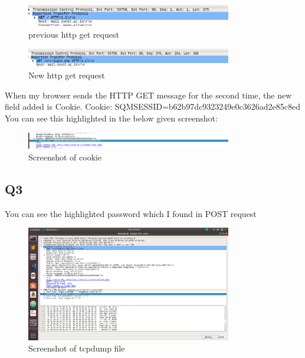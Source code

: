 \documentclass{article}
\begin{document}
 \begin{figure}[H]
 \centering
 \includegraphics[width=0.8\textwidth]{../Set5/q2/a.png}
 \caption{\label{fig:PING}previous http get request}
 \end{figure}
 
  \begin{figure}[H]
 \centering
 \includegraphics[width=0.8\textwidth]{../Set5/q2/b.png}
 \caption{\label{fig:PING}New http get request}
 \end{figure}

When my browser sends the HTTP GET message for the second time, the new
field added is Cookie. Cookie: SQMSESSID=b62b97dc9323249e0c3626ad2e85c8ed
You can see this highlighted in the below given screenshot: \\
 

 \begin{figure}[H]
 \centering
 \includegraphics[width=0.8\textwidth]{../Set5/q2/c.png}
 \caption{\label{fig:PING}Screenshot of cookie}
 \end{figure}

\subsection{Q3}
You can see the highlighted password which I found in POST request \\
 \begin{figure}[H]
 \centering
 \includegraphics[width=0.8\textwidth]{../Set5/q3/a.png}
 \caption{\label{fig:PING}Screenshot of tcpdump file}
 \end{figure}
\end{document}
